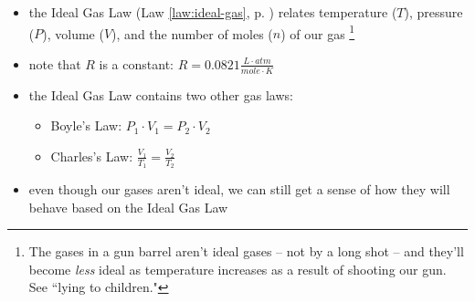 \documentclass[11pt, oneside]{article}   	%
\begin{document}
\begin{itemize}
\item the Ideal Gas Law (Law \ref{law:ideal-gas}, p. \pageref{law:ideal-gas}) relates temperature ($T$), pressure ($P$),  volume ($V$), and the number of moles ($n$) of our gas
\footnote{The gases in a gun barrel aren't ideal gases -- not by a long shot -- and they'll become \emph{less} ideal as temperature increases as a result of shooting our gun. See ``lying to children."}
\item note that $R$ is a constant: $ R = 0.0821 \frac{L \cdot atm}{mole \cdot K}$


\item the Ideal Gas Law contains two other gas laws:
\begin{itemize}
\item Boyle's Law: $P_1 \cdot V_1 = P_2 \cdot V_2$
\item Charles's Law: $\frac{V_1}{T_1} = \frac{V_2}{T_2}$
\end{itemize}
\item even though our gases aren't ideal, we can still get a sense of how they will behave based on the Ideal Gas Law
\end{itemize}
\end{document}
